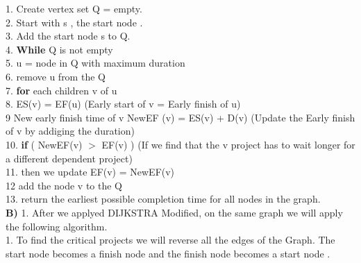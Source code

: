 \documentclass[10 pt]{article}
\begin{document}
1. Create vertex set Q  = empty.\\ 
2. Start with s , the start node .\\
3. Add the start node s to Q.\\
4. \textbf{While} Q is not empty \\
5. \indent u =  node in Q with maximum duration\\
6. \indent remove u from the Q\\
7. \indent  \textbf{for} each children v of u \\
8. \indent \indent  ES(v) = EF(u)    (Early start of v  = Early finish of u) \\
9 \indent \indent    New early finish  time of v  NewEF (v) = ES(v) + D(v) (Update  the Early finish of v by addiging the duration)\\
10. \indent \indent     \textbf {if} (  NewEF(v)  $ > $ EF(v) ) (If we find that the v project has to wait longer for a different dependent project)\\
11. \indent \indent \indent then we update EF(v) = NewEF(v) \\
12 \indent  add the node v to the Q\\
13. return the earliest possible completion time for all nodes in the graph.\\
         
\textbf{B)}
1. After we applyed DIJKSTRA Modified, on the same graph we will apply the following algorithm.\\
1. To find the critical projects we will reverse all the edges of the Graph. The start node becomes a finish node and the finish node becomes a start node .\\
\end{document}
